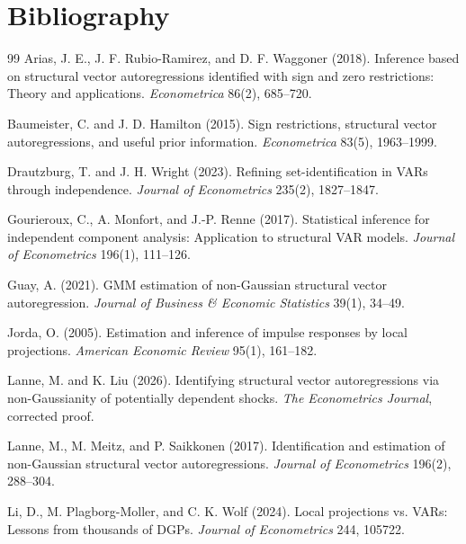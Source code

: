 \documentclass[11pt]{article}
\theoremstyle{definition}
\theoremstyle{plain}
\theoremstyle{remark}
\begin{document}
\section*{Bibliography}
\begin{thebibliography}{99}
Arias, J. E., J. F. Rubio-Ramirez, and D. F. Waggoner (2018).
Inference based on structural vector autoregressions identified with sign and zero restrictions: Theory and applications.
\emph{Econometrica} 86(2), 685--720.

Baumeister, C. and J. D. Hamilton (2015).
Sign restrictions, structural vector autoregressions, and useful prior information.
\emph{Econometrica} 83(5), 1963--1999.

Drautzburg, T. and J. H. Wright (2023).
Refining set-identification in VARs through independence.
\emph{Journal of Econometrics} 235(2), 1827--1847.

Gourieroux, C., A. Monfort, and J.-P. Renne (2017).
Statistical inference for independent component analysis: Application to structural VAR models.
\emph{Journal of Econometrics} 196(1), 111--126.

Guay, A. (2021).
GMM estimation of non-Gaussian structural vector autoregression.
\emph{Journal of Business \& Economic Statistics} 39(1), 34--49.

Jorda, O. (2005).
Estimation and inference of impulse responses by local projections.
\emph{American Economic Review} 95(1), 161--182.

Lanne, M. and K. Liu (2026).
Identifying structural vector autoregressions via non-Gaussianity of potentially dependent shocks.
\emph{The Econometrics Journal}, corrected proof.

Lanne, M., M. Meitz, and P. Saikkonen (2017).
Identification and estimation of non-Gaussian structural vector autoregressions.
\emph{Journal of Econometrics} 196(2), 288--304.

Li, D., M. Plagborg-Moller, and C. K. Wolf (2024).
Local projections vs. VARs: Lessons from thousands of DGPs.
\emph{Journal of Econometrics} 244, 105722.


\end{thebibliography}
\end{document}
